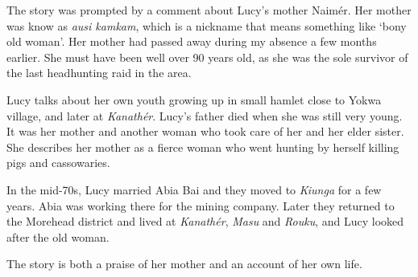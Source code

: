 The story was prompted by a comment about Lucy's mother Naimér. Her mother was know as \textit{ausi kamkam}, which is a nickname that means something like `bony old woman'. Her mother had passed away during my absence a few months earlier. She must have been well over 90 years old, as she was the sole survivor of the last headhunting raid in the area.

Lucy talks about her own youth growing up in small hamlet close to Yokwa village, and later at \textit{Kanathér}. Lucy's father died when she was still very young. It was her mother and another woman who took care of her and her elder sister. She describes her mother as a fierce woman who went hunting by herself killing pigs and cassowaries.

In the mid-70s, Lucy married Abia Bai and they moved to \textit{Kiunga} for a few years. Abia was working there for the mining company. Later they returned to the Morehead district and lived at \textit{Kanathér}, \textit{Masu} and \textit{Rouku}, and Lucy looked after the old woman.

The story is both a praise of her mother and an account of her own life. 